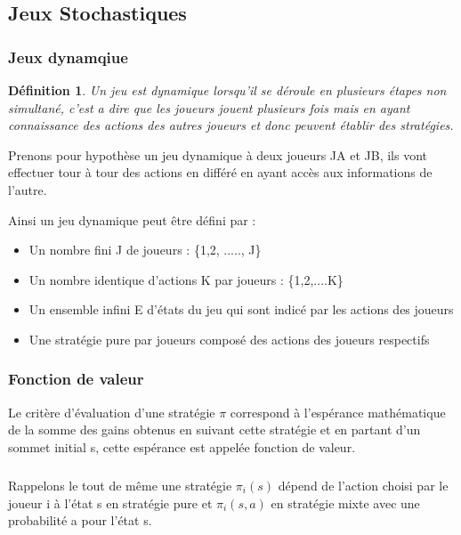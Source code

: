 \documentclass[a4paper, 12pt, twoside]{article}
\newtheorem{definition}{Définition}
\begin{document}
{{{{\subsection{Jeux Stochastiques}
\subsubsection{Jeux dynamqiue}
\begin{definition}
Un jeu est dynamique lorsqu'il se déroule en plusieurs étapes non simultané, c'est a dire que les joueurs jouent plusieurs fois mais en ayant connaissance des actions des autres joueurs et donc peuvent établir des stratégies.
\end{definition}

Prenons pour hypothèse un jeu dynamique à deux joueurs  JA et JB, ils vont effectuer tour à tour des actions en différé en ayant accès aux informations de l'autre. \newline

Ainsi un \textsf{jeu dynamique} peut être défini par : 
\begin{itemize}
\item Un nombre fini J de joueurs : \{1,2, ....., J\}
\item Un nombre identique d'actions K par joueurs : \{1,2,....K\}  
\item Un ensemble infini E d'états du jeu qui sont indicé par les actions des joueurs 
\item Une stratégie pure par joueurs composé des actions des joueurs respectifs
\end{itemize}

\subsubsection{Fonction de valeur}
Le critère d'évaluation d'une stratégie $\pi$ correspond à l'espérance mathématique de la somme des gains obtenus en suivant cette stratégie et en partant d'un sommet initial \textsf{s},  cette espérance est appelée \textsf{fonction de valeur}.

\subparagraph*{}{Rappelons le tout de même une stratégie $\pi_{i}(s)$ dépend de l'action choisi par le joueur \textsf{i} à l'état \textsf{s} en stratégie pure et $\pi_{i}(s,a)$ en stratégie mixte avec une probabilité \textsf{a} pour l'état \textsf{s}}.

}}}}
\end{document}
